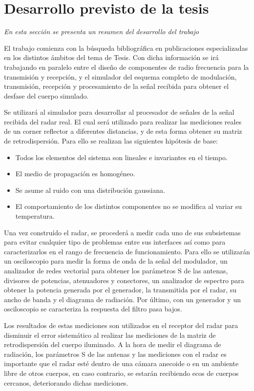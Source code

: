 \chapter{Desarrollo previsto de la tesis} \label{ch:development}

\textit{En esta sección se presenta un resumen del desarrollo del trabajo}

El trabajo comienza con la búsqueda bibliográfica en publicaciones especializadas en los distintos ámbitos del tema
de Tesis. Con dicha información se irá trabajando en paralelo entre el diseño de componentes de radio frecuencia para la transmisión y recepción, y el simulador del esquema completo de modulación, transmisión, recepción y procesamiento de la señal recibida para obtener el desfase del cuerpo simulado.

Se utilizará al simulador para desarrollar al procesador de señales de la señal recibida del radar real. El cual será utilizado para realizar las mediciones reales de un corner reflector a diferentes distancias, y de esta forma obtener su matriz de retrodispersión. Para ello se realizan las siguientes hipótesis de base:

\begin{itemize}
    \item Todos los elementos del sistema son lineales e invariantes en el tiempo.
    \item El medio de propagación es homogéneo.
    \item Se asume al ruido con una distribución gaussiana.
    \item El comportamiento de los distintos componentes no se modifica al variar su temperatura.
\end{itemize}

Una vez construído el radar, se procederá a medir cada uno de sus subsistemas para evitar cualquier tipo de problemas entre sus interfaces así como para caracterizarlos en el rango de frecuencia de funcionamiento. Para ello se utilizarán un osciloscopio para medir la forma de onda de la señal del modulador, un analizador de redes vectorial para obtener los parámetros S de las antenas, divisores de potencias, atenuadores y conectores, un analizador de espectro para obtener la potencia generada por el generador, la transmitida por el radar, su ancho de banda y el diagrama de radiación. Por último, con un generador y un osciloscopio se caracteriza la respuesta del filtro pasa bajos. 

Los resultados de estas mediciones son utilizados en el receptor del radar para disminuir el error sistemático al realizar las mediciones de la matriz de retrodispersión del cuerpo iluminado. A la hora de medir el diagrama de radiación, los parámetros S de las antenas y las mediciones con el radar es importante que el radar esté dentro de una cámara anecoide o en un ambiente libre de otros cuerpos, en caso contrario, se estarán recibiendo ecos de cuerpos cercanos, deteriorando dichas mediciones. 

